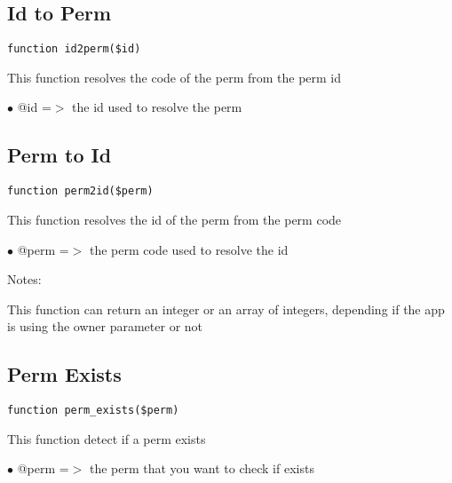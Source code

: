 \documentclass[a4paper]{book}
\begin{document}
\hypertarget{toc223}{}
\subsection{Id to Perm}

\begin{lstlisting}
function id2perm($id)
\end{lstlisting}

This function resolves the code of the perm from the perm id

\begin{compactitem}
\item[\color{myblue}$\bullet$] @id =$>$ the id used to resolve the perm
\end{compactitem}

\hypertarget{toc224}{}
\subsection{Perm to Id}

\begin{lstlisting}
function perm2id($perm)
\end{lstlisting}

This function resolves the id of the perm from the perm code

\begin{compactitem}
\item[\color{myblue}$\bullet$] @perm =$>$ the perm code used to resolve the id
\end{compactitem}

Notes:

This function can return an integer or an array of integers, depending
if the app is using the owner parameter or not

\hypertarget{toc225}{}
\subsection{Perm Exists}

\begin{lstlisting}
function perm_exists($perm)
\end{lstlisting}

This function detect if a perm exists

\begin{compactitem}
\item[\color{myblue}$\bullet$] @perm =$>$ the perm that you want to check if exists
\end{compactitem}
\end{document}

